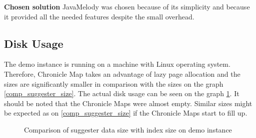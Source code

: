 \textbf{Chosen solution} JavaMelody was chosen because of its simplicity and because it provided all the needed
features despite the small overhead.

\subsection{Disk Usage}
The demo instance is running on a machine with Linux operating system. Therefore, Chronicle Map takes an advantage of
lazy page allocation and the sizes are significantly smaller in comparison with the sizes on the graph \ref{comp_suggester_size}.
The actual disk usage can be seen on the graph \ref{comp_suggester_size_demo}.
It should be noted that the Chronicle Maps were almost empty.
Similar sizes might be expected as on \ref{comp_suggester_size} if the Chronicle Maps start to fill up.

\begin{figure}[htbp]
    \centering
    \caption{Comparison of suggester data size with index size on demo instance}
    \label{comp_suggester_size_demo}
\end{figure}
